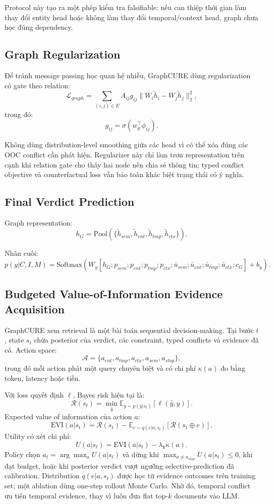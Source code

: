 \documentclass[11pt,a4paper]{article}
\begin{document}
Protocol này tạo ra một phép kiểm tra falsifiable: nếu can thiệp thời gian làm thay đổi entity head hoặc không làm thay đổi temporal/context head, graph chưa học đúng dependency.

\subsection{Graph Regularization}

Để tránh message passing học quan hệ nhiễu, GraphCURE dùng regularization có gate theo relation:
\[
\mathcal{L}_{graph}
=
\sum_{(i,j)\in E}
A_{ij}g_{ij}
\|W_i\tilde{h}_i-W_j\tilde{h}_j\|_2^2,
\]
trong đó:
\[
g_{ij} = \sigma(w_g^\top \phi_{ij}).
\]

Không dùng distribution-level smoothing giữa các head vì có thể xóa đúng các OOC conflict cần phát hiện. Regularizer này chỉ làm trơn representation trên cạnh khi relation gate cho thấy hai node nên chia sẻ thông tin; typed conflict objective và counterfactual loss vẫn bảo toàn khác biệt trạng thái có ý nghĩa.

\subsection{Final Verdict Prediction}

Graph representation:
\[
h_G = \text{Pool}(\{\tilde{h}_{sem},\tilde{h}_{ent},\tilde{h}_{tmp},\tilde{h}_{ctx}\}).
\]

Nhãn cuối:
\[
p(y|C,I,M)
=
\text{Softmax}
\left(
W_y[
h_G;
p_{sem};p_{ent};p_{tmp};p_{ctx};
\bar{u}_{sem};\bar{u}_{ent};\bar{u}_{tmp};\bar{u}_{ctx};
c_G
]+b_y
\right).
\]

\subsection{Budgeted Value-of-Information Evidence Acquisition}

GraphCURE xem retrieval là một bài toán sequential decision-making. Tại bước $t$, state $s_t$ chứa posterior của verdict, các constraint, typed conflicts và evidence đã có. Action space:
\[
\mathcal{A}=\{a_{ent},a_{tmp},a_{ctx},a_{sem},a_{stop}\},
\]
trong đó mỗi action phát một query chuyên biệt và có chi phí $\kappa(a)$ đo bằng token, latency hoặc tiền.

Với loss quyết định $\ell$, Bayes risk hiện tại là:
\[
\mathcal{R}(s_t)=\min_{\hat y}\mathbb{E}_{y\sim p(y|s_t)}[\ell(\hat y,y)].
\]
Expected value of information của action $a$:
\[
\mathrm{EVI}(a|s_t)
=
\mathcal{R}(s_t)
-
\mathbb{E}_{e\sim q(e|a,s_t)}
\left[\mathcal{R}(s_t\oplus e)\right].
\]
Utility có xét chi phí:
\[
U(a|s_t)=\mathrm{EVI}(a|s_t)-\lambda_{\$}\kappa(a).
\]
Policy chọn $a_t=\arg\max_a U(a|s_t)$ và dừng khi $\max_{a\neq a_{stop}}U(a|s_t)\leq 0$, khi đạt budget, hoặc khi posterior verdict vượt ngưỡng selective-prediction đã calibration. Distribution $q(e|a,s_t)$ được học từ evidence outcomes trên training set; một ablation dùng one-step rollout Monte Carlo. Nhờ đó, temporal conflict ưu tiên temporal evidence, thay vì luôn đưa flat top-$k$ documents vào LLM.
\end{document}
